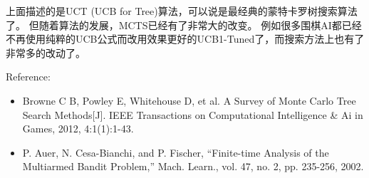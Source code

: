 \documentclass[10pt,a4paper]{ctexbook}
\begin{document}
上面描述的是UCT (UCB for Tree)算法，可以说是最经典的蒙特卡罗树搜索算法了。
但随着算法的发展，MCTS已经有了非常大的改变。
例如很多围棋AI都已经不再使用纯粹的UCB公式而改用效果更好的UCB1-Tuned了，而搜索方法上也有了非常多的改动了。

Reference:
\begin{itemize}
\item Browne C B, Powley E, Whitehouse D, et al. A Survey of Monte Carlo Tree Search Methods[J]. IEEE Transactions on Computational Intelligence \& Ai in Games, 2012, 4:1(1):1-43.
\item P. Auer, N. Cesa-Bianchi, and P. Fischer, “Finite-time Analysis  of the Multiarmed Bandit Problem,” Mach. Learn., vol. 47, no. 2,  pp. 235-256, 2002.
\end{itemize}

\ifx\mlbook\undefined
    
\end{document}
